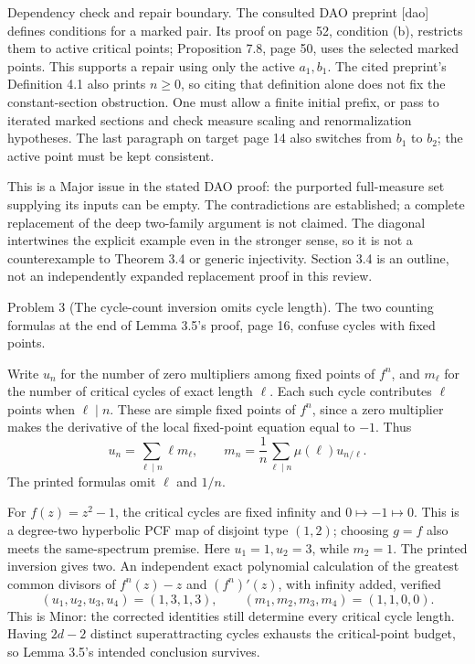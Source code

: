 \documentclass[10pt]{article}
\begin{document}
Dependency check and repair boundary. The consulted DAO preprint [dao] defines conditions for a marked pair. Its proof on page 52, condition (b), restricts them to active critical points; Proposition 7.8, page 50, uses the selected marked points. This supports a repair using only the active \(a_1,b_1\). The cited preprint’s Definition 4.1 also prints \(n\geq0\), so citing that definition alone does not fix the constant-section obstruction. One must allow a finite initial prefix, or pass to iterated marked sections and check measure scaling and renormalization hypotheses. The last paragraph on target page 14 also switches from \(b_1\) to \(b_2\); the active point must be kept consistent.\par
This is a Major issue in the stated DAO proof: the purported full-measure set supplying its inputs can be empty. The contradictions are established; a complete replacement of the deep two-family argument is not claimed. The diagonal intertwines the explicit example even in the stronger sense, so it is not a counterexample to Theorem 3.4 or generic injectivity. Section 3.4 is an outline, not an independently expanded replacement proof in this review.\par
Problem 3 (The cycle-count inversion omits cycle length).  The two counting formulas at the end of Lemma 3.5’s proof, page 16, confuse cycles with fixed points.\par
Write \(u_n\) for the number of zero multipliers among fixed points of \(f^n\), and \(m_\ell\) for the number of critical cycles of exact length \(\ell\). Each such cycle contributes \(\ell\) points when \(\ell\mid n\). These are simple fixed points of \(f^n\), since a zero multiplier makes the derivative of the local fixed-point equation equal to \(-1\). Thus \[u_n=\sum_{\ell\mid n}\ell m_\ell,\qquad
 m_n=\frac1n\sum_{\ell\mid n}\mu(\ell)u_{n/\ell}.\] The printed formulas omit \(\ell\) and \(1/n\).\par
For \(f(z)=z^2-1\), the critical cycles are fixed infinity and \(0\mapsto-1\mapsto0\). This is a degree-two hyperbolic PCF map of disjoint type \((1,2)\); choosing \(g=f\) also meets the same-spectrum premise. Here \(u_1=1,u_2=3\), while \(m_2=1\). The printed inversion gives two. An independent exact polynomial calculation of the greatest common divisors of \(f^n(z)-z\) and \((f^n)'(z)\), with infinity added, verified \[(u_1,u_2,u_3,u_4)=(1,3,1,3),\qquad
 (m_1,m_2,m_3,m_4)=(1,1,0,0).\] This is Minor: the corrected identities still determine every critical cycle length. Having \(2d-2\) distinct superattracting cycles exhausts the critical-point budget, so Lemma 3.5’s intended conclusion survives.\par
\end{document}
